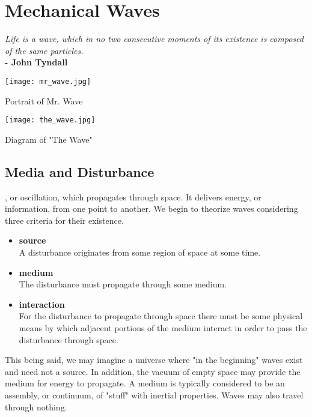 \chapter{Mechanical Waves}

\textit{Life is a wave, which in no two consecutive moments of its existence is composed of the same particles.}\\
\noindent\textbf{-   John Tyndall}

\vspace{1cm}


\begin{marginfigure}%
  \texttt{[image: mr\_wave.jpg]}
  \caption{Portrait of Mr. Wave}
  \label{fig:marginfig}
\end{marginfigure}


\begin{marginfigure}[60pt]
  \texttt{[image: the\_wave.jpg]}
  \caption{Diagram of "The Wave"}
  \label{fig:marginfig}
\end{marginfigure}

\section{Media and Disturbance}
, or oscillation, which propagates through space.  It delivers energy, or information, from one point to another.  We begin to theorize waves considering three criteria for their existence.
\begin{itemize}
\item \textbf{source}\\ A disturbance originates from some region of space at some time.
\item \textbf{medium}\\ The disturbance must propagate through some medium. 
\item \textbf{interaction}\\  For the disturbance to propagate through space there must be some physical means by which adjacent portions of the medium interact in order to pass the disturbance through space.
\end{itemize}
This being said, we may imagine a universe where "in the beginning" waves exist and need not a source.  In addition, the vacuum of empty space may provide the medium for energy to propagate.  A medium is typically considered to be an assembly, or continuum, of "stuff" with inertial properties.  Waves may also travel through nothing. 

